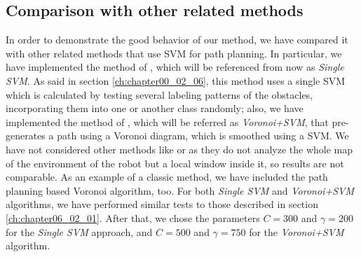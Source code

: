 \subsection{Comparison with other related methods}\label{ch:chapter06_02_02}

In order to demonstrate the good behavior of our method, we have compared it with other related methods that use \ac{SVM} for path planning. In particular, we have implemented the method of \cite{miura2006support}, which will be referenced from now as \textit{Single \ac{SVM}}. As said in section \ref{ch:chapter00_02_06}, this method uses a single \ac{SVM} which is calculated by testing several labeling patterns of the obstacles, incorporating them into one or another class randomly; also, we have implemented the method of \cite{yang2012safe}, which will be referred as \textit{Voronoi+\ac{SVM}}, that pre-generates a path using a Voronoi diagram, which is smoothed using a \ac{SVM}. We have not considered other methods like \cite{sarkar2008mobile} or \cite{qingyang2012local} as they do not analyze the whole map of the environment of the robot but a local window inside it, so results are not comparable. As an example of a classic method, we have included the path planning based Voronoi algorithm, too.
For both \textit{Single \ac{SVM}} and \textit{Voronoi+\ac{SVM}} algorithms, we have performed similar tests to those described in section \ref{ch:chapter06_02_01}. After that, we chose the parameters $C=300$ and $\gamma=200$ for the \textit{Single \ac{SVM}} approach, and $C=500$ and $\gamma=750$ for the \textit{Voronoi+\ac{SVM}} algorithm.

